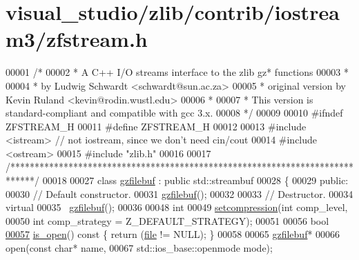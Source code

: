 \hypertarget{visual__studio_2zlib_2contrib_2iostream3_2zfstream_8h_source}{}\section{visual\+\_\+studio/zlib/contrib/iostream3/zfstream.h}
\label{visual__studio_2zlib_2contrib_2iostream3_2zfstream_8h_source}

\begin{DoxyCode}
00001 \textcolor{comment}{/*}
00002 \textcolor{comment}{ * A C++ I/O streams interface to the zlib gz* functions}
00003 \textcolor{comment}{ *}
00004 \textcolor{comment}{ * by Ludwig Schwardt <schwardt@sun.ac.za>}
00005 \textcolor{comment}{ * original version by Kevin Ruland <kevin@rodin.wustl.edu>}
00006 \textcolor{comment}{ *}
00007 \textcolor{comment}{ * This version is standard-compliant and compatible with gcc 3.x.}
00008 \textcolor{comment}{ */}
00009 
00010 \textcolor{preprocessor}{#ifndef ZFSTREAM\_H}
00011 \textcolor{preprocessor}{#define ZFSTREAM\_H}
00012 
00013 \textcolor{preprocessor}{#include <istream>}  \textcolor{comment}{// not iostream, since we don't need cin/cout}
00014 \textcolor{preprocessor}{#include <ostream>}
00015 \textcolor{preprocessor}{#include "zlib.h"}
00016 
00017 \textcolor{comment}{/*****************************************************************************/}
00018 
00027 \textcolor{keyword}{class }\hyperlink{classgzfilebuf}{gzfilebuf} : \textcolor{keyword}{public} std::streambuf
00028 \{
00029 \textcolor{keyword}{public}:
00030   \textcolor{comment}{//  Default constructor.}
00031   \hyperlink{classgzfilebuf}{gzfilebuf}();
00032 
00033   \textcolor{comment}{//  Destructor.}
00034   \textcolor{keyword}{virtual}
00035   ~\hyperlink{classgzfilebuf}{gzfilebuf}();
00036 
00048   \textcolor{keywordtype}{int}
00049   \hyperlink{classgzfilebuf_ad109ea4fc4ca7cc19d8014b53375255d}{setcompression}(\textcolor{keywordtype}{int} comp\_level,
00050                  \textcolor{keywordtype}{int} comp\_strategy = Z\_DEFAULT\_STRATEGY);
00051 
00056   \textcolor{keywordtype}{bool}
\hyperlink{classgzfilebuf_a24dfb3e35c147aaf3a562c1ea4268757}{00057}   \hyperlink{classgzfilebuf_a24dfb3e35c147aaf3a562c1ea4268757}{is\_open}()\textcolor{keyword}{ const }\{ \textcolor{keywordflow}{return} (\hyperlink{structfile}{file} != NULL); \}
00058 
00065   \hyperlink{classgzfilebuf}{gzfilebuf}*
00066   open(\textcolor{keyword}{const} \textcolor{keywordtype}{char}* name,
00067        std::ios\_base::openmode mode);

\end{DoxyCode}
